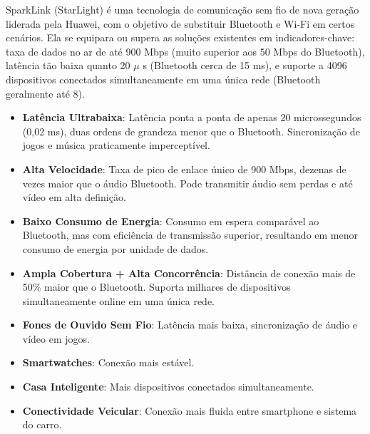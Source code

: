 
SparkLink (StarLight) é uma tecnologia de comunicação sem fio de nova geração liderada pela Huawei, com o objetivo de substituir Bluetooth e Wi-Fi em certos cenários. Ela se equipara ou supera as soluções existentes em indicadores-chave: taxa de dados no ar de até 900 Mbps (muito superior aos 50 Mbps do Bluetooth), latência tão baixa quanto 20 $\mu$ s (Bluetooth cerca de 15 ms), e suporte a 4096 dispositivos conectados simultaneamente em uma única rede (Bluetooth geralmente até 8).


\begin{itemize}
  \item \textbf{Latência Ultrabaixa}: Latência ponta a ponta de apenas 20 microssegundos (0,02 ms), duas ordens de grandeza menor que o Bluetooth. Sincronização de jogos e música praticamente imperceptível.
  \item \textbf{Alta Velocidade}: Taxa de pico de enlace único de 900 Mbps, dezenas de vezes maior que o áudio Bluetooth. Pode transmitir áudio sem perdas e até vídeo em alta definição.
  \item \textbf{Baixo Consumo de Energia}: Consumo em espera comparável ao Bluetooth, mas com eficiência de transmissão superior, resultando em menor consumo de energia por unidade de dados.
  \item \textbf{Ampla Cobertura + Alta Concorrência}: Distância de conexão mais de 50\% maior que o Bluetooth. Suporta milhares de dispositivos simultaneamente online em uma única rede.
\end{itemize}


\begin{itemize}
  \item \textbf{Fones de Ouvido Sem Fio}: Latência mais baixa, sincronização de áudio e vídeo em jogos.
  \item \textbf{Smartwatches}: Conexão mais estável.
  \item \textbf{Casa Inteligente}: Mais dispositivos conectados simultaneamente.
  \item \textbf{Conectividade Veicular}: Conexão mais fluida entre smartphone e sistema do carro.
\end{itemize}


